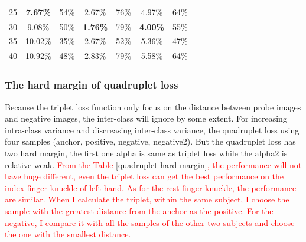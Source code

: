 \begin{table}[h]
\begin{tabular}{ccccccc}
    25    & \textbf{7.67\%} & 54\%                                                                                     & 2.67\%          & 76\%                                                                                     & 4.97\%          & 64\%                                                                                     \\
    30    & 9.08\%          & 50\%                                                                                     & \textbf{1.76\%} & 79\%                                                                                     & \textbf{4.00\%} & 55\%                                                                                     \\
    35    & 10.02\%         & 35\%                                                                                     & 2.67\%          & 52\%                                                                                     & 5.36\%          & 47\%                                                                                     \\
    40    & 10.92\%         & 48\%                                                                                     & 2.83\%          & 79\%                                                                                     & 5.58\%          & 64\%                                                                                     \\ \hline
    \end{tabular}
    \label{triplet-hard-margin}
\end{table}

\subsubsection{The hard margin of quadruplet loss}
Because the triplet loss function only focus on the distance between probe images and negative images, the inter-class will ignore by some extent. For increasing intra-class variance and discreasing inter-class variance, the quadruplet loss using four samples (anchor, positive, negative, negative2). But the quadruplet loss has two hard margin, the first one alpha is same as triplet loss while the alpha2 is relative weak. \textcolor{red}{From the Table \ref{quadruplet-hard-margin}, the performance will not have huge different, even the triplet loss can get the best performance on the index finger knuckle of left hand. As for the rest finger knuckle, the performance are similar. When I calculate the triplet, within the same subject, I choose the sample with the greatest distance from the anchor as the positive. For the negative, I compare it with all the samples of the other two subjects and choose the one with the smallest distance.}

